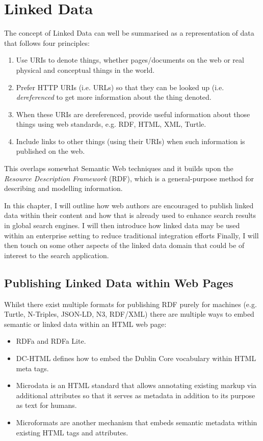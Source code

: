 \chapter{Linked Data}
\label{stateoftheart}

The concept of Linked Data can well be summarised as a representation of
data that follows four principles:\cite{berners2011linked}

\begin{enumerate}
\item Use URIs to denote things, whether pages/documents on the web
  or real physical and conceptual things in the world.
\item Prefer HTTP URIs (i.e. URLs) so that they can be looked
  up (i.e. \emph{dereferenced} to get more information about the thing denoted.
\item When these URIs are dereferenced, provide useful information about
  those things using web standards, e.g. RDF, HTML, XML, Turtle.
\item Include links to other things (using their URIs) when such
  information is published on the web.
\end{enumerate}

This overlaps somewhat Semantic Web techniques and it builds upon
the \emph{Resource Description Framework} (RDF)\cite{lassila1999resource},
which is a general-purpose method for describing and modelling information.

In this chapter, I will outline how web authors are encouraged to publish
linked data within their content and how that is already used to enhance
search results in global search engines. I will then introduce how linked
data may be used within an enterprise setting to reduce traditional
integration efforts Finally, I will then touch on some other aspects of the linked
data domain that could be of interest to the search application.

\section{Publishing Linked Data within Web Pages}
\label{publishing-linked-data}

Whilst there exist multiple formats for publishing RDF purely for machines
(e.g. Turtle\cite{world2014rdf}, N-Triples, JSON-LD\cite{world2014json},
N3, RDF/XML) there are multiple ways to embed semantic or linked data within
an HTML web page:

\begin{itemize}
  \item RDFa\cite{adida2012rdfa} and RDFa Lite\cite{lite2004rdfa}.
  \item DC-HTML defines how to embed the Dublin Core vocabulary within HTML
    meta tags.\cite{johnston2008expressing}
  \item Microdata\cite{htmlstandard} is an HTML standard that allows
    annotating existing markup
    via additional attributes so that it serves as metadata in addition to
    its purpose as text for humans.
  \item Microformats are another mechanism that embeds semantic metadata
    within existing HTML tags and attributes.
\end{itemize}

